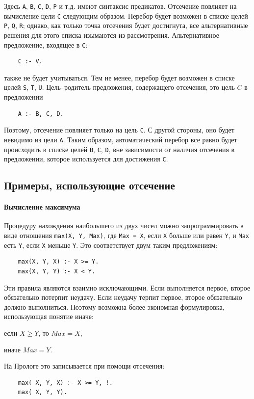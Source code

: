 \documentclass[12pt, openany, twoside]{book} %
\begin{document}
Здесь {\tt А}, {\tt В}, {\tt С}, {\tt D}, {\tt P} и т.д. имеют синтаксис предикатов. Отсечение повлияет на вычисление цели {\tt С} следующим образом. Перебор будет возможен в списке целей {\tt Р}, {\tt Q}, {\tt R}; однако, как только точка отсечения будет достигнута, все альтернативные решения для этого списка изымаются из рассмотрения. Альтернативное предложение, входящее в {\tt С}:
{\tt \begin{verbatim}
    С :- V.
\end{verbatim}}
\noindent также не будет учитываться. Тем не менее, перебор будет возможен в списке целей {\tt S}, {\tt T}, {\tt U}. Цель--родитель предложения, содержащего отсечения, это цель $C$ в предложении
{\tt \begin{verbatim}
    А :- В, С, D.
\end{verbatim}}

Поэтому, отсечение повлияет только на цель {\tt С}. С другой стороны, оно будет невидимо из цели {\tt А}. Таким образом, автоматический перебор все равно будет происходить в списке целей {\tt В}, {\tt С}, {\tt D}, вне зависимости от наличия отсечения в предложении, которое используется для достижения {\tt С}.

\subsection{Примеры, использующие отсечение}
\paragraph{Вычисление максимума}
Процедуру нахождения наибольшего из двух чисел можно запрограммировать в виде отношения {\tt max(X, Y, Мах)}, где {\tt Мах = X}, если {\tt X} больше или равен {\tt Y}, и {\tt Мах} есть {\tt Y}, если {\tt X} меньше {\tt Y}. Это соответствует двум таким предложениям:

{\tt \begin{verbatim}
    max(X, Y, X) :- X >= Y.
    max(X, Y, Y) :- X < Y.
\end{verbatim}}

Эти правила являются взаимно исключающими. Если выполняется первое, второе обязательно потерпит неудачу. Если неудачу терпит первое, второе обязательно должно выполниться. Поэтому возможна более экономная формулировка, использующая понятие иначе:

если $X \geq Y$, то $Max = X$,

иначе $Max = Y$.

На Прологе это записывается при помощи отсечения:
{\tt \begin{verbatim}
    max( X, Y, X) :- X >= Y, !.
    max( X, Y, Y).
\end{verbatim}}
\end{document}
